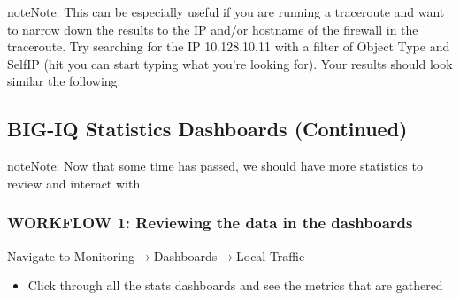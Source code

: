 \documentclass[letterpaper,10pt,english]{sphinxmanual}
\begin{document}

\begin{sphinxadmonition}{note}{Note:}
This can be especially useful if you are running a traceroute and want
to narrow down the results to the IP and/or hostname of the firewall in
the traceroute. Try searching for the IP 10.128.10.11 with a filter of
Object Type and SelfIP (hit you can start typing what you’re looking
for). Your results should look similar the following:
\end{sphinxadmonition}



\subsection{BIG-IQ Statistics Dashboards (Continued)}
\label{\detokenize{class1/module4/lab6:big-iq-statistics-dashboards-continued}}\label{\detokenize{class1/module4/lab6::doc}}
\begin{sphinxadmonition}{note}{Note:}
Now that some time has passed, we should have more statistics to review and
interact with.
\end{sphinxadmonition}


\subsubsection{WORKFLOW 1: Reviewing the data in the dashboards}
\label{\detokenize{class1/module4/lab6:workflow-1-reviewing-the-data-in-the-dashboards}}
Navigate to Monitoring\(\rightarrow\)Dashboards\(\rightarrow\)Local Traffic
\begin{itemize}
\item {} 
Click through all the stats dashboards and see the metrics that are
gathered


\end{itemize}
\end{document}
